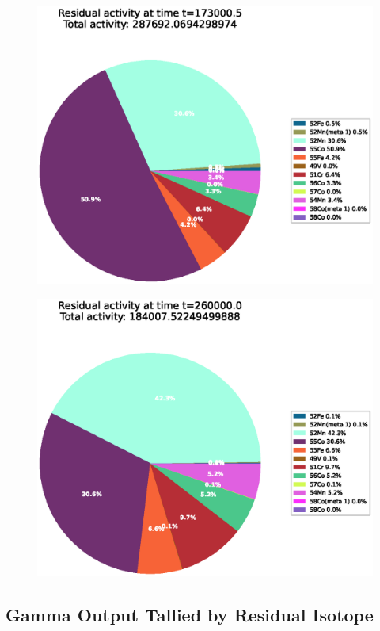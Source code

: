 \begin{figure}[!htb]
\centering
\includegraphics[width=0.8\linewidth]{chapters/activity_code/fe-activity-v2/residual-activity/0233_173000.eps}
\caption{}
\label{fig:activity-v2-residual-activity-173000s}
\end{figure}

\begin{figure}[!htb]
\centering
\includegraphics[width=0.8\linewidth]{chapters/activity_code/fe-activity-v2/residual-activity/0300_260000.eps}
\caption{}
\label{fig:activity-v2-residual-activity-260000s}
\end{figure}



\clearpage

\subsection{Gamma Output Tallied by Residual Isotope}

